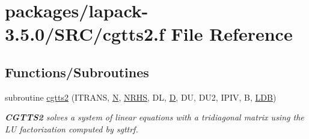 \hypertarget{cgtts2_8f}{}\section{packages/lapack-\/3.5.0/\+S\+R\+C/cgtts2.f File Reference}
\label{cgtts2_8f}
\subsection*{Functions/\+Subroutines}
\begin{DoxyCompactItemize}
\item 
subroutine \hyperlink{group__complexGTcomputational_gab3cb48a1dae8355cc937e9c97ac5ded0}{cgtts2} (I\+T\+R\+A\+N\+S, \hyperlink{polmisc_8c_a0240ac851181b84ac374872dc5434ee4}{N}, \hyperlink{example__user_8c_aa0138da002ce2a90360df2f521eb3198}{N\+R\+H\+S}, D\+L, \hyperlink{odrpack_8h_a7dae6ea403d00f3687f24a874e67d139}{D}, D\+U, D\+U2, I\+P\+I\+V, B, \hyperlink{example__user_8c_a50e90a7104df172b5a89a06c47fcca04}{L\+D\+B})
\begin{DoxyCompactList}\small\item\em {\bfseries C\+G\+T\+T\+S2} solves a system of linear equations with a tridiagonal matrix using the L\+U factorization computed by sgttrf. \end{DoxyCompactList}\end{DoxyCompactItemize}
